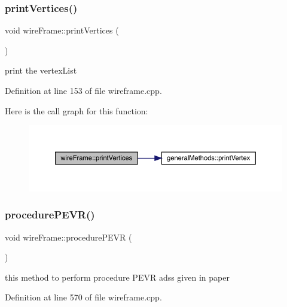 \subsubsection{\texorpdfstring{print\+Vertices()}{printVertices()}}
{\footnotesize\ttfamily void wire\+Frame\+::print\+Vertices (\begin{DoxyParamCaption}{ }\end{DoxyParamCaption})}

print the vertex\+List

Definition at line 153 of file wireframe.\+cpp.

Here is the call graph for this function\+:
\nopagebreak
\begin{figure}[H]
\begin{center}
\leavevmode
\includegraphics[width=350pt]{classwire_frame_a1f30c3a4320bb7016abedab3a1cf18d5_cgraph}
\end{center}
\end{figure}
\mbox{\label{classwire_frame_a3799d04d265a08d30e06d5d18facd04d}} 
\subsubsection{\texorpdfstring{procedure\+P\+E\+V\+R()}{procedurePEVR()}}
{\footnotesize\ttfamily void wire\+Frame\+::procedure\+P\+E\+VR (\begin{DoxyParamCaption}{ }\end{DoxyParamCaption})}

this method to perform procedure P\+E\+VR adss given in paper 

Definition at line 570 of file wireframe.\+cpp.

